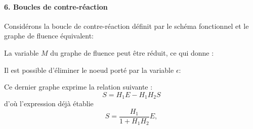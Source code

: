 \paragraph{6. Boucles de contre-réaction}

Considérons la boucle de contre-réaction définit par le schéma fonctionnel et 
le graphe de fluence équivalent:
\begin{center}
\end{center}

La variable $M$ du graphe de fluence peut être réduit, ce qui donne :

\begin{center}
\end{center}

Il est possible d'éliminer le noeud porté par la variable $\epsilon$:

\begin{center}
\end{center}
Ce dernier graphe exprime la relation suivante :
$$
S=H_1E-H_1H_2S
$$
d'où l'expression déjà établie
$$
    S=\dfrac{H_1}{1+H_1H_2}E,
$$

